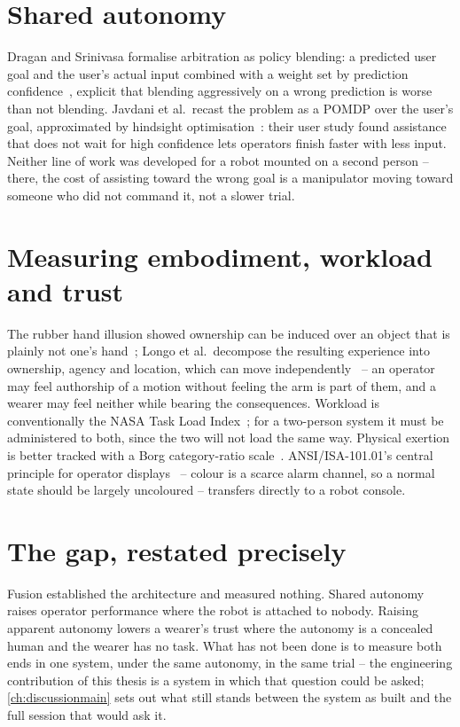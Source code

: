 \section{Shared autonomy}

Dragan and Srinivasa formalise arbitration as policy blending: a predicted
user goal and the user's actual input combined with a weight set by
prediction confidence~\cite{dragan2013policyblending}, explicit that
blending aggressively on a wrong prediction is worse than not blending.
Javdani et al.\ recast the problem as a POMDP over the user's goal,
approximated by hindsight optimisation~\cite{javdani2015hindsight}: their
user study found assistance that does not wait for high confidence lets
operators finish faster with less input. Neither line of work was developed
for a robot mounted on a second person -- there, the cost of assisting
toward the wrong goal is a manipulator moving toward someone who did not
command it, not a slower trial.

\section{Measuring embodiment, workload and trust}

The rubber hand illusion showed ownership can be induced over an object that
is plainly not one's hand~\cite{botvinick1998rubber}; Longo et al.\
decompose the resulting experience into ownership, agency and location,
which can move independently~\cite{longo2008embodiment} -- an operator may
feel authorship of a motion without feeling the arm is part of them, and a
wearer may feel neither while bearing the consequences. Workload is
conventionally the NASA Task Load Index~\cite{hart1988nasatlx}; for a
two-person system it must be administered to both, since the two will not
load the same way. Physical exertion is better tracked with a Borg
category-ratio scale~\cite{borg1982perceived}. ANSI/ISA-101.01's central
principle for operator displays~\cite{isa101} -- colour is a scarce alarm
channel, so a normal state should be largely uncoloured -- transfers
directly to a robot console.

\section{The gap, restated precisely}

Fusion established the architecture and measured nothing. Shared autonomy
raises operator performance where the robot is attached to nobody. Raising
apparent autonomy lowers a wearer's trust where the autonomy is a concealed
human and the wearer has no task. What has not been done is to measure both
ends in one system, under the same autonomy, in the same trial -- the
engineering contribution of this thesis is a system in which that question
could be asked; \cref{ch:discussionmain} sets out what still stands between
the system as built and the full session that would ask it.
